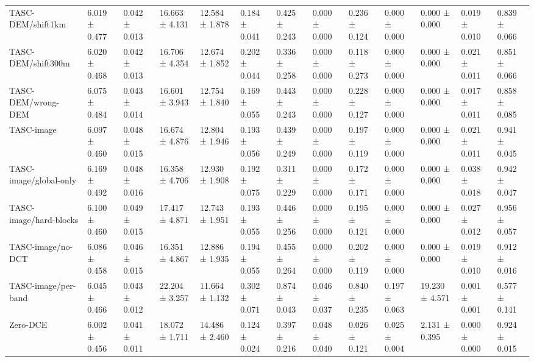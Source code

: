 \begin{table}[t]
\begin{tabular}{lllllllllllll}
TASC-DEM/shift1km & 6.019 ± 0.477 & 0.042 ± 0.013 & 16.663 ± 4.131 & 12.584 ± 1.878 & 0.184 ± 0.041 & 0.425 ± 0.243 & 0.000 ± 0.000 & 0.236 ± 0.124 & 0.000 ± 0.000 & 0.000 ± 0.000 & 0.019 ± 0.010 & 0.839 ± 0.066 \\
TASC-DEM/shift300m & 6.020 ± 0.468 & 0.042 ± 0.013 & 16.706 ± 4.354 & 12.674 ± 1.852 & 0.202 ± 0.044 & 0.336 ± 0.258 & 0.000 ± 0.000 & 0.118 ± 0.273 & 0.000 ± 0.000 & 0.000 ± 0.000 & 0.021 ± 0.011 & 0.851 ± 0.066 \\
TASC-DEM/wrong-DEM & 6.075 ± 0.484 & 0.043 ± 0.014 & 16.601 ± 3.943 & 12.754 ± 1.840 & 0.169 ± 0.055 & 0.443 ± 0.243 & 0.000 ± 0.000 & 0.228 ± 0.127 & 0.000 ± 0.000 & 0.000 ± 0.000 & 0.017 ± 0.011 & 0.858 ± 0.085 \\
TASC-image & 6.097 ± 0.460 & 0.048 ± 0.015 & 16.674 ± 4.876 & 12.804 ± 1.946 & 0.193 ± 0.056 & 0.439 ± 0.249 & 0.000 ± 0.000 & 0.197 ± 0.119 & 0.000 ± 0.000 & 0.000 ± 0.000 & 0.021 ± 0.011 & 0.941 ± 0.045 \\
TASC-image/global-only & 6.169 ± 0.492 & 0.048 ± 0.016 & 16.358 ± 4.706 & 12.930 ± 1.908 & 0.192 ± 0.075 & 0.311 ± 0.229 & 0.000 ± 0.000 & 0.172 ± 0.171 & 0.000 ± 0.000 & 0.000 ± 0.000 & 0.038 ± 0.018 & 0.942 ± 0.047 \\
TASC-image/hard-blocks & 6.100 ± 0.460 & 0.049 ± 0.015 & 17.417 ± 4.871 & 12.743 ± 1.951 & 0.193 ± 0.055 & 0.446 ± 0.256 & 0.000 ± 0.000 & 0.195 ± 0.121 & 0.000 ± 0.000 & 0.000 ± 0.000 & 0.027 ± 0.012 & 0.956 ± 0.057 \\
TASC-image/no-DCT & 6.086 ± 0.458 & 0.046 ± 0.015 & 16.351 ± 4.867 & 12.886 ± 1.935 & 0.194 ± 0.055 & 0.455 ± 0.264 & 0.000 ± 0.000 & 0.202 ± 0.119 & 0.000 ± 0.000 & 0.000 ± 0.000 & 0.019 ± 0.010 & 0.912 ± 0.016 \\
TASC-image/per-band & 6.045 ± 0.466 & 0.043 ± 0.012 & 22.204 ± 3.257 & 11.664 ± 1.132 & 0.302 ± 0.071 & 0.874 ± 0.043 & 0.046 ± 0.037 & 0.840 ± 0.235 & 0.197 ± 0.063 & 19.230 ± 4.571 & 0.001 ± 0.001 & 0.577 ± 0.141 \\
Zero-DCE & 6.002 ± 0.456 & 0.041 ± 0.011 & 18.072 ± 1.711 & 14.486 ± 2.460 & 0.124 ± 0.024 & 0.397 ± 0.216 & 0.048 ± 0.040 & 0.026 ± 0.121 & 0.025 ± 0.004 & 2.131 ± 0.395 & 0.000 ± 0.000 & 0.924 ± 0.015 \\
\bottomrule
\end{tabular}
\end{table}
